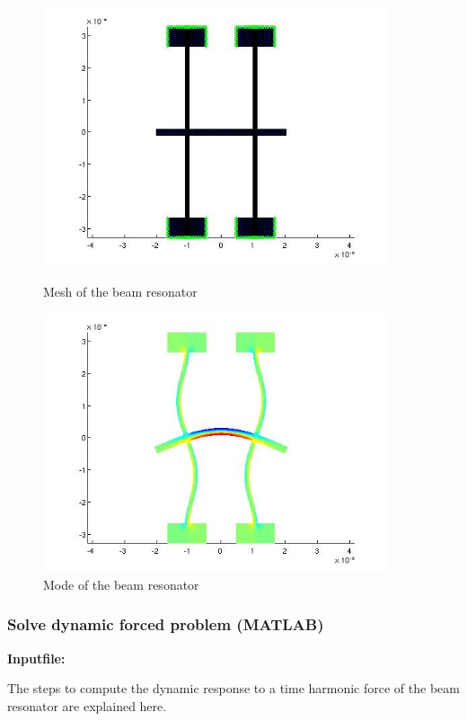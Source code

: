 \begin{figure}[htbp]
\centering
\includegraphics[height = 3in]{fig/mich_resonator_mesh.jpg}
\caption{Mesh of the beam resonator}
\label{fig:MichResonatorMesh}
\includegraphics[height = 3in]{fig/mich_resonator_mode.jpg}
\caption{Mode of the beam resonator}
\label{fig:MichResonatorMode}
\end{figure}

\clearpage
\subsubsection*{Solve dynamic forced problem (MATLAB)}
\begin{flushleft}
  \textbf{Inputfile:}
  \\
\end{flushleft}
\hspace{1in}
{\footnotesize
{}
}

\clearpage
The steps to compute the dynamic response to a time harmonic
force of the beam resonator are explained here. 

